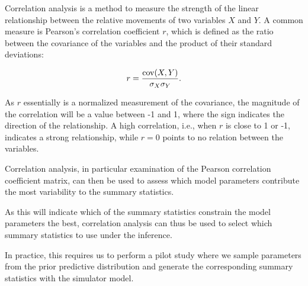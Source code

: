 Correlation analysis is a method to measure the strength of the linear relationship between the relative movements of two variables $X$ and $Y$. A common measure is Pearson's correlation coefficient $r$, which is defined as the ratio between the covariance of the variables and the product of their standard deviations: 

\begin{equation}
    r = \frac{\mathrm{cov}\qty(X, Y)}{\sigma_X \sigma_Y}.
\end{equation} 

As $r$ essentially is a normalized measurement of the covariance, the magnitude of the correlation will be a value between -1 and 1, where the sign indicates the direction of the relationship. A high correlation, i.e., when $r$ is close to 1 or -1, indicates a strong relationship, while $r=0$ points to no relation between the variables.

Correlation analysis, in particular examination of the Pearson correlation coefficient matrix, can then be used to assess which model parameters contribute the most variability to the summary statistics.

As this will indicate which of the summary statistics constrain the model parameters the best, correlation analysis can thus be used to select which summary statistics to use under the inference. %

In practice, this requires us to perform a pilot study where we sample parameters from the prior predictive distribution and generate the corresponding summary statistics with the simulator model.  

